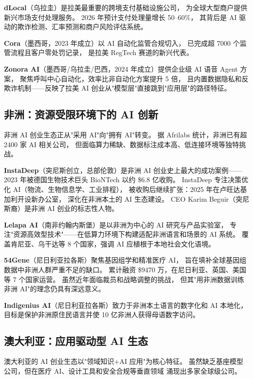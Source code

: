 \textbf{dLocal}（乌拉圭）是拉美最重要的跨境支付基础设施公司，
为全球大型商户提供新兴市场支付处理服务。
2026 年预计支付处理量增长 50--60\%，
其背后是 AI 驱动的欺诈检测、汇率预测和商户风险评估系统。

\textbf{Cora}（墨西哥，2023 年成立）以 AI 自动化监管合规切入，
已完成超 7000 个监管流程且客户零处罚记录，
是拉美 RegTech 赛道的新兴代表。

\textbf{Zonora AI}（墨西哥/乌拉圭/巴西，2024 年成立）提供企业级 AI 语音 Agent 方案，
聚焦呼叫中心自动化，效率比非自动化方案提升 5 倍，
且内置数据隐私和反欺诈机制——反映了拉美 AI 创业从"模型层"直接跳到"应用层"的路径特征。

\subsection{非洲：资源受限环境下的 AI 创新}

非洲 AI 创业生态正从"采用 AI"向"拥有 AI"转变。
据 Afrilabs 统计，非洲已有超 2400 家 AI 相关公司，
但面临算力稀缺、数据标注成本高、低连接环境等独特挑战。

\textbf{InstaDeep}（突尼斯创立，总部伦敦）是非洲 AI 创业史上最大的成功案例——
2023 年被德国生物技术巨头 BioNTech 以约 \$6.8 亿收购。
InstaDeep 专注决策优化 AI（物流、生物信息学、工业排程），
被收购后继续扩张：2025 年在卢旺达基加利开设新办公室，
深化在非洲本土的 AI 生态建设。
CEO Karim Beguir（突尼斯裔）是非洲 AI 创业的标志性人物。

\textbf{Lelapa AI}（南非约翰内斯堡）是以非洲为中心的 AI 研究与产品实验室，
专注"资源高效型技术"——在低算力环境下构建适配非洲语言和场景的 AI 系统。
覆盖肯尼亚、乌干达等 8 个国家，强调 AI 应植根于本地社会文化语境。

\textbf{54Gene}（尼日利亚拉各斯）聚焦基因组学和精准医疗 AI，
旨在填补全球基因组数据中非洲人群严重不足的缺口。
累计融资 \$9470 万，在尼日利亚、英国、美国等 7 个国家运营。
虽然近年面临裁员和战略调整的挑战，
但其"用非洲数据训练非洲 AI"的理念仍具有深远意义。

\textbf{Indigenius AI}（尼日利亚拉各斯）致力于非洲本土语言的数字化和 AI 本地化，
目标是保护非洲原住民语言并使 10 亿非洲人获得母语数字访问。

\subsection{澳大利亚：应用驱动型 AI 生态}

澳大利亚的 AI 创业生态以"领域知识+AI 应用"为核心特征。
虽然缺乏基座模型公司，但在医疗 AI、设计工具和安全合规等垂直领域
涌现出多家全球级公司。


